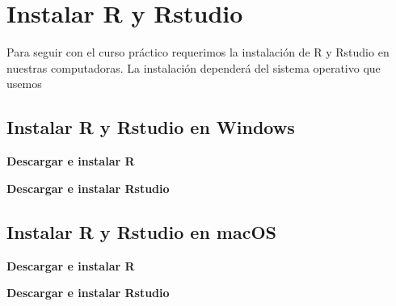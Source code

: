 \documentclass[]{tufte-handout}
\begin{document}
\hypertarget{instalar-r-y-rstudio}{%
\section{Instalar R y Rstudio}\label{instalar-r-y-rstudio}}

Para seguir con el curso práctico requerimos la instalación de R y
Rstudio en nuestras computadoras. La instalación dependerá del sistema
operativo que usemos

\hypertarget{instalar-r-y-rstudio-en-windows}{%
\subsection{Instalar R y Rstudio en
Windows}\label{instalar-r-y-rstudio-en-windows}}

\textbf{Descargar e instalar R}

\textbf{Descargar e instalar Rstudio}

\hypertarget{instalar-r-y-rstudio-en-macos}{%
\subsection{Instalar R y Rstudio en
macOS}\label{instalar-r-y-rstudio-en-macos}}

\textbf{Descargar e instalar R}

\textbf{Descargar e instalar Rstudio}
\end{document}
